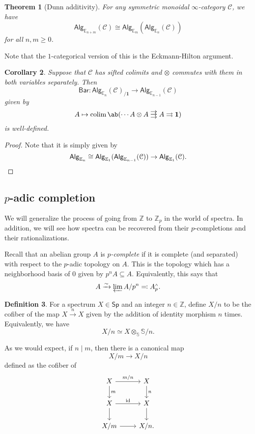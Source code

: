 \documentclass[10pt]{amsart}
\newtheorem{thm}{Theorem}[subsection]
\newtheorem{cor}[thm]{Corollary}
\theoremstyle{definition}
\newtheorem{defn}[thm]{Definition}
\theoremstyle{remark}
\theoremstyle{plain}
\theoremstyle{definition}
\theoremstyle{remark}
\newcommand{\Z}{\mathbb{Z}}
\newcommand{\E}{\mathbb{E}}
\newcommand{\bS}{\mathbb{S}}
\newcommand{\mc}[1]{\mathcal{#1}}
\newcommand{\mr}[1]{\mathrm{#1}}
\newcommand{\ms}[1]{\mathsf{#1}}
\newcommand{\1}{\mathbf{1}}
\newcommand{\2}{\mathbf{2}}
\newcommand{\3}{\mathbf{3}}
\newcommand{\sw}{\mathsmaller{\wedge}}
\newcommand*{\triple}[2][.1ex]{%
    \mathrel{\vcenter{\offinterlineskip%
    \hbox{$#2$}\vskip#1\hbox{$#2$}\vskip#1\hbox{$#2$}}}}
\DeclareMathOperator*{\colim}{colim}
\begin{document}
\begin{thm}[Dunn additivity]\label{thm:dunnadditivity}
    For any symmetric monoidal $\infty$-category $\mc{C}$, we have
    \[ \ms{Alg}_{\E_{n+m}}(\mc{C}) \cong \ms{Alg}_{\E_m}(\ms{Alg}_{\E_n}(\mc{C})) \]
    for all $n, m \geq 0$.
\end{thm}

Note that the $1$-categorical version of this is the Eckmann-Hilton argument.

\begin{cor}
    Suppose that $\mc{C}$ has sifted colimits and $\otimes$ commutes with them in both variables separately. Then
    \[ \ms{Bar} \colon \ms{Alg}_{\E_n}(\mc{C})_{/\1} \to \ms{Alg}_{\E_{n-1}}(\mc{C}) \]
    given by 
    \[ A \mapsto \colim \ab(\cdots A \otimes A \triple{\to} A \rightrightarrows \1) \]
    is well-defined.
\end{cor}

\begin{proof}
    Note that it is simply given by
    \[ \ms{Alg}_{\E_n} \cong \ms{Alg}_{\E_1} (\ms{Alg}_{\E_{n-1}}(\mc{C})) \to \ms{Alg}_{\E_1}(\mc{C}). \qedhere \]
\end{proof}

\subsection{$p$-adic completion}%
\label{sub:p-adic completion}

We will generalize the process of going from $\Z$ to $\Z_p$ in the world of spectra. In addition, we will see how spectra can be recovered from their $p$-completions and their rationalizations.

Recall that an abelian group $A$ is \textit{$p$-complete} if it is complete (and separated) with respect to the $p$-adic topology on $A$. This is the topology which has a neighborhood basis of $0$ given by $p^n A \subseteq A$. Equivalently, this says that
\[ A \xrightarrow{\sim} \varprojlim A/p^n \eqqcolon A^{\sw}_p. \]

\begin{defn}
    For a spectrum $X \in \ms{Sp}$ and an integer $n \in \Z$, define $X/n$ to be the cofiber of the map $X \xrightarrow{n} X$ given by the addition of identity morphism $n$ times. Equivalently, we have
    \[ X/n \simeq X \otimes_{\bS} \bS/n. \]
\end{defn}

As we would expect, if $n \mid m$, then there is a canonical map
\[ X/m \to X/n \] defined as the cofiber of
\begin{equation*}
\begin{tikzcd}
    X \ar{d}{m} \ar{r}{m/n} & X \ar{d}{n} \\
    X \ar{r}{\mr{id}} \ar{d} & X \ar{d} \\
    X/m \ar{r} & X/n.
\end{tikzcd}
\end{equation*}
\end{document}
